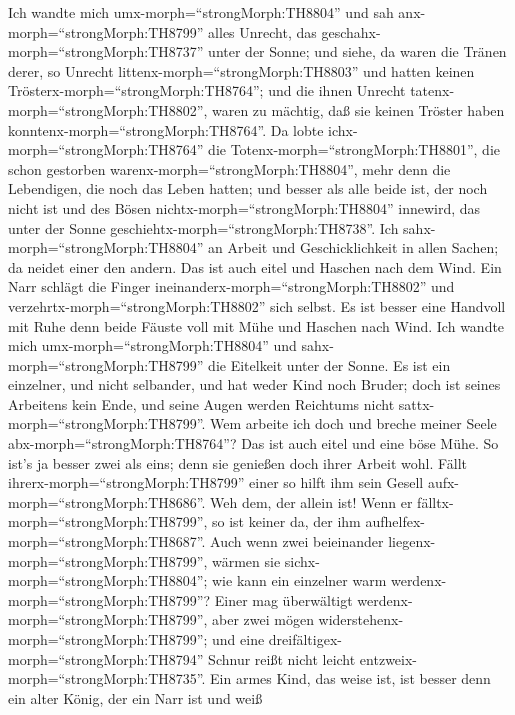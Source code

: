  Ich wandte mich umx-morph=``strongMorph:TH8804'' und sah
anx-morph=``strongMorph:TH8799'' alles Unrecht, das
geschahx-morph=``strongMorph:TH8737'' unter der Sonne; und siehe, da
waren die Tränen derer, so Unrecht littenx-morph=``strongMorph:TH8803''
und hatten keinen Trösterx-morph=``strongMorph:TH8764''; und die ihnen
Unrecht tatenx-morph=``strongMorph:TH8802'', waren zu mächtig, daß sie
keinen Tröster haben konntenx-morph=``strongMorph:TH8764''. 
Da lobte ichx-morph=``strongMorph:TH8764'' die
Totenx-morph=``strongMorph:TH8801'', die schon gestorben
warenx-morph=``strongMorph:TH8804'', mehr denn die Lebendigen, die noch
das Leben hatten;  und besser als alle beide ist, der noch
nicht ist und des Bösen nichtx-morph=``strongMorph:TH8804'' innewird,
das unter der Sonne geschiehtx-morph=``strongMorph:TH8738''.
 Ich sahx-morph=``strongMorph:TH8804'' an Arbeit und
Geschicklichkeit in allen Sachen; da neidet einer den andern. Das ist
auch eitel und Haschen nach dem Wind.  Ein Narr schlägt die
Finger ineinanderx-morph=``strongMorph:TH8802'' und
verzehrtx-morph=``strongMorph:TH8802'' sich selbst.  Es ist
besser eine Handvoll mit Ruhe denn beide Fäuste voll mit Mühe und
Haschen nach Wind.  Ich wandte mich
umx-morph=``strongMorph:TH8804'' und sahx-morph=``strongMorph:TH8799''
die Eitelkeit unter der Sonne.  Es ist ein einzelner, und
nicht selbander, und hat weder Kind noch Bruder; doch ist seines
Arbeitens kein Ende, und seine Augen werden Reichtums nicht
sattx-morph=``strongMorph:TH8799''. Wem arbeite ich doch und breche
meiner Seele abx-morph=``strongMorph:TH8764''? Das ist auch eitel und
eine böse Mühe.  So ist's ja besser zwei als eins; denn sie
genießen doch ihrer Arbeit wohl.  Fällt
ihrerx-morph=``strongMorph:TH8799'' einer so hilft ihm sein Gesell
aufx-morph=``strongMorph:TH8686''. Weh dem, der allein ist! Wenn er
fälltx-morph=``strongMorph:TH8799'', so ist keiner da, der ihm
aufhelfex-morph=``strongMorph:TH8687''.  Auch wenn zwei
beieinander liegenx-morph=``strongMorph:TH8799'', wärmen sie
sichx-morph=``strongMorph:TH8804''; wie kann ein einzelner warm
werdenx-morph=``strongMorph:TH8799''?  Einer mag
überwältigt werdenx-morph=``strongMorph:TH8799'', aber zwei mögen
widerstehenx-morph=``strongMorph:TH8799''; und eine
dreifältigex-morph=``strongMorph:TH8794'' Schnur reißt nicht leicht
entzweix-morph=``strongMorph:TH8735''.  Ein armes Kind, das
weise ist, ist besser denn ein alter König, der ein Narr ist und weiß
